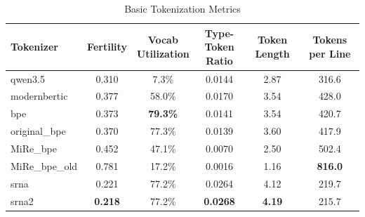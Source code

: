 \begin{table}[htbp]
\centering
\caption{Basic Tokenization Metrics}
\label{tab:basic_metrics}
\begin{tabular}{lccccc}
\toprule
Tokenizer & Fertility & \makecell{Vocab \\ Utilization} & \makecell{Type-Token \\ Ratio} & Token Length & Tokens per Line \\
\midrule
qwen3.5 & 0.310 & 7.3\% & 0.0144 & 2.87 & 316.6 \\
modernbertic & 0.377 & 58.0\% & 0.0170 & 3.54 & 428.0 \\
bpe & 0.373 & \textbf{79.3\%} & 0.0141 & 3.54 & 420.7 \\
original\_bpe & 0.370 & 77.3\% & 0.0139 & 3.60 & 417.9 \\
MiRe\_bpe & 0.452 & 47.1\% & 0.0070 & 2.50 & 502.4 \\
MiRe\_bpe\_old & 0.781 & 17.2\% & 0.0016 & 1.16 & \textbf{816.0} \\
srna & 0.221 & 77.2\% & 0.0264 & 4.12 & 219.7 \\
srna2 & \textbf{0.218} & 77.2\% & \textbf{0.0268} & \textbf{4.19} & 215.7 \\
\bottomrule
\end{tabular}
\end{table}